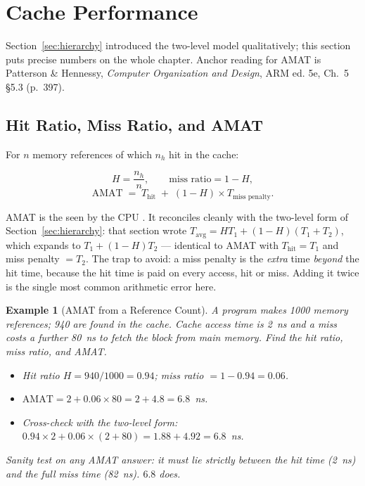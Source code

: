 \documentclass[11pt]{article}
\newtheorem{example}{Example}[section]
\begin{document}
\section{Cache Performance}
\label{sec:performance}

Section~\ref{sec:hierarchy} introduced the two-level model qualitatively; this section puts precise numbers on the whole chapter. Anchor reading for AMAT is Patterson \& Hennessy, \textit{Computer Organization and Design}, ARM ed. 5e, Ch.~5 \S5.3 (p.~397).

\subsection{Hit Ratio, Miss Ratio, and AMAT}

For $n$ memory references of which $n_h$ hit in the cache:

\[
  H = \frac{n_h}{n}, \qquad
  \text{miss ratio} = 1 - H,
\]
\[
  \text{AMAT} \;=\; T_{\text{hit}} \;+\; (1-H)\times T_{\text{miss penalty}} .
\]

AMAT is the  seen by the CPU \cite[\S5.3, p.~397]{PattersonHennessy2017_computer_organization_design}. It reconciles cleanly with the two-level form of Section~\ref{sec:hierarchy}: that section wrote $T_{\text{avg}} = H T_1 + (1-H)(T_1+T_2)$, which expands to $T_1 + (1-H)T_2$ --- identical to AMAT with $T_{\text{hit}} = T_1$ and miss penalty $= T_2$. The trap to avoid: a miss penalty is the \emph{extra} time \emph{beyond} the hit time, because the hit time is paid on every access, hit or miss. Adding it twice is the single most common arithmetic error here.

\begin{example}[AMAT from a Reference Count]
\label{ex:amat}
A program makes 1000 memory references; 940 are found in the cache. Cache access time is 2~ns and a miss costs a further 80~ns to fetch the block from main memory. Find the hit ratio, miss ratio, and AMAT.

\begin{itemize}
  \item Hit ratio $H = 940/1000 = 0.94$; miss ratio $= 1 - 0.94 = 0.06$.
  \item $\text{AMAT} = 2 + 0.06 \times 80 = 2 + 4.8 = 6.8$~ns.
  \item Cross-check with the two-level form: $0.94 \times 2 + 0.06 \times (2 + 80) = 1.88 + 4.92 = 6.8$~ns.
\end{itemize}

Sanity test on any AMAT answer: it must lie strictly between the hit time (2~ns) and the full miss time (82~ns). $6.8$ does.
\end{example}
\end{document}
